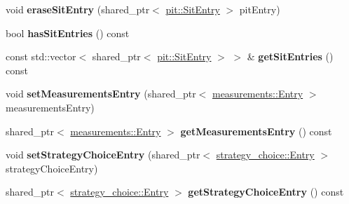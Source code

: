 \begin{DoxyCompactItemize}
\item 
void {\bfseries erase\+Sit\+Entry} (shared\+\_\+ptr$<$ \hyperlink{classnfd_1_1pit_1_1SitEntry}{pit\+::\+Sit\+Entry} $>$ pit\+Entry)\hypertarget{classnfd_1_1name__tree_1_1Entry_ab52e0534040e2dcbf64d4b3c2dcd32c8}{}\label{classnfd_1_1name__tree_1_1Entry_ab52e0534040e2dcbf64d4b3c2dcd32c8}

\item 
bool {\bfseries has\+Sit\+Entries} () const\hypertarget{classnfd_1_1name__tree_1_1Entry_a8d43bd78d7bec0c8f4702dec474cad6a}{}\label{classnfd_1_1name__tree_1_1Entry_a8d43bd78d7bec0c8f4702dec474cad6a}

\item 
const std\+::vector$<$ shared\+\_\+ptr$<$ \hyperlink{classnfd_1_1pit_1_1SitEntry}{pit\+::\+Sit\+Entry} $>$ $>$ \& {\bfseries get\+Sit\+Entries} () const\hypertarget{classnfd_1_1name__tree_1_1Entry_a3c1b038bc01178f67f66bec58dbf6726}{}\label{classnfd_1_1name__tree_1_1Entry_a3c1b038bc01178f67f66bec58dbf6726}

\item 
void {\bfseries set\+Measurements\+Entry} (shared\+\_\+ptr$<$ \hyperlink{classnfd_1_1measurements_1_1Entry}{measurements\+::\+Entry} $>$ measurements\+Entry)\hypertarget{classnfd_1_1name__tree_1_1Entry_a70d5b38454bd422b00342efe503fb1b2}{}\label{classnfd_1_1name__tree_1_1Entry_a70d5b38454bd422b00342efe503fb1b2}

\item 
shared\+\_\+ptr$<$ \hyperlink{classnfd_1_1measurements_1_1Entry}{measurements\+::\+Entry} $>$ {\bfseries get\+Measurements\+Entry} () const\hypertarget{classnfd_1_1name__tree_1_1Entry_ae16106ade20d2f66f7872e78a2aafa9c}{}\label{classnfd_1_1name__tree_1_1Entry_ae16106ade20d2f66f7872e78a2aafa9c}

\item 
void {\bfseries set\+Strategy\+Choice\+Entry} (shared\+\_\+ptr$<$ \hyperlink{classnfd_1_1strategy__choice_1_1Entry}{strategy\+\_\+choice\+::\+Entry} $>$ strategy\+Choice\+Entry)\hypertarget{classnfd_1_1name__tree_1_1Entry_ad819003bc6ac6d6851fc99b2789d857e}{}\label{classnfd_1_1name__tree_1_1Entry_ad819003bc6ac6d6851fc99b2789d857e}

\item 
shared\+\_\+ptr$<$ \hyperlink{classnfd_1_1strategy__choice_1_1Entry}{strategy\+\_\+choice\+::\+Entry} $>$ {\bfseries get\+Strategy\+Choice\+Entry} () const\hypertarget{classnfd_1_1name__tree_1_1Entry_a12cb38e8b3b4e1fca081765feec7a0b7}{}\label{classnfd_1_1name__tree_1_1Entry_a12cb38e8b3b4e1fca081765feec7a0b7}

\end{DoxyCompactItemize}
